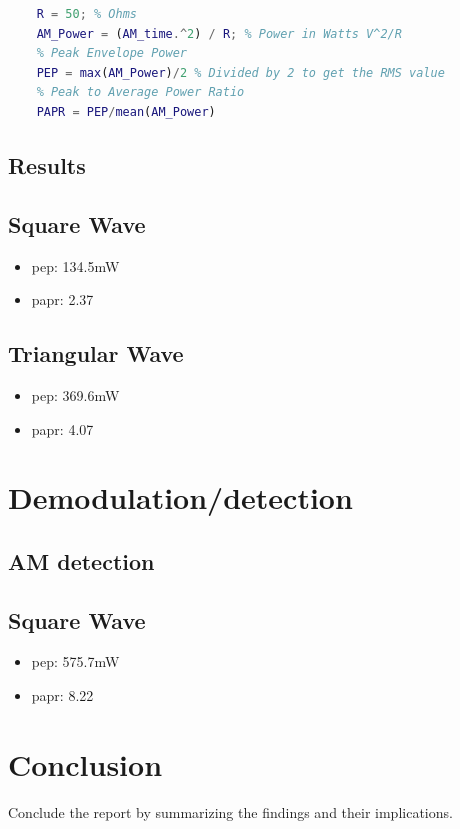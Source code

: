 \documentclass[a4paper]{article}
\begin{document}
\begin{lstlisting}[language=Matlab]
    % AM Power
    R = 50; % Ohms
    AM_Power = (AM_time.^2) / R; % Power in Watts V^2/R
    % Peak Envelope Power
    PEP = max(AM_Power)/2 % Divided by 2 to get the RMS value
    % Peak to Average Power Ratio
    PAPR = PEP/mean(AM_Power)
\end{lstlisting}

\subsection{Results}
\subsection*{Square Wave}
\begin{itemize}
    \item \gls{pep}: 134.5mW
    \item \gls{papr}: 2.37
\end{itemize}

\subsection*{Triangular Wave}
\begin{itemize}
    \item \gls{pep}: 369.6mW
    \item \gls{papr}: 4.07
\end{itemize}

\section{Demodulation/detection}

\subsection{AM detection}
\subsection*{Square Wave}
\begin{itemize}
    \item \gls{pep}: 575.7mW
    \item \gls{papr}: 8.22
\end{itemize}

\section{Conclusion}
Conclude the report by summarizing the findings and their implications.
\end{document}
